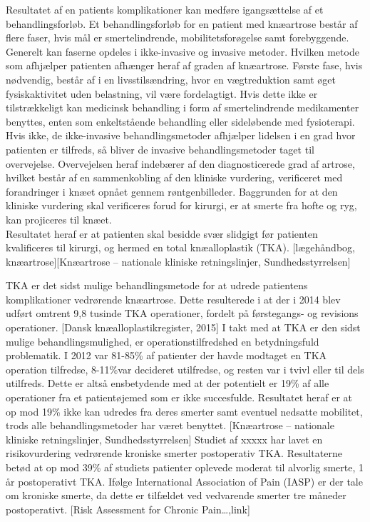 Resultatet af en patients komplikationer kan medføre igangsættelse af et behandlingsforløb. Et behandlingsforløb for en patient med knæartrose består af flere faser, hvis mål er smertelindrende, mobilitetsforøgelse samt forebyggende. Generelt kan faserne opdeles i ikke-invasive og invasive metoder. Hvilken metode som afhjælper patienten afhænger heraf af graden af knæartrose. Første fase, hvis nødvendig, består af i en livsstilsændring, hvor en vægtreduktion samt øget fysiskaktivitet uden belastning, vil være fordelagtigt. Hvis dette ikke er tilstrækkeligt kan medicinsk behandling i form af smertelindrende medikamenter benyttes, enten som enkeltstående behandling eller sideløbende med fysioterapi. Hvis ikke, de ikke-invasive behandlingsmetoder afhjælper lidelsen i en grad hvor patienten er tilfreds, så bliver de invasive behandlingsmetoder taget til overvejelse. Overvejelsen heraf indebærer af den diagnosticerede grad af artrose, hvilket består af en sammenkobling af den kliniske vurdering, verificeret med forandringer i knæet opnået gennem røntgenbilleder. Baggrunden for at den kliniske vurdering skal verificeres forud for kirurgi, er at smerte fra hofte og ryg, kan projiceres til knæet.\\
Resultatet heraf er at patienten skal besidde svær slidgigt før patienten kvalificeres til kirurgi, og hermed en total knæalloplastik (TKA).  [lægehåndbog, knæartrose][Knæartrose – nationale kliniske retningslinjer, Sundhedsstyrrelsen]

TKA er det sidst mulige behandlingsmetode for at udrede patientens komplikationer vedrørende knæartrose. Dette resulterede i at der i 2014 blev udført omtrent 9,8 tusinde TKA operationer, fordelt på førstegangs- og revisions operationer. [Dansk knæalloplastikregister, 2015] I takt med at TKA er den sidst mulige behandlingsmulighed, er operationstilfredshed en betydningsfuld problematik. I 2012 var 81-85\% af patienter der havde modtaget en TKA operation tilfredse, 8-11\%var decideret utilfredse, og resten var i tvivl eller til dels utilfreds. Dette er altså ensbetydende med at der potentielt er 19\% af alle operationer fra et patientøjemed som er ikke succesfulde. Resultatet heraf er at op mod 19\% ikke kan udredes fra deres smerter samt eventuel nedsatte mobilitet, trods alle behandlingsmetoder har været benyttet. [Knæartrose – nationale kliniske retningslinjer, Sundhedsstyrrelsen] Studiet af xxxxx har lavet en risikovurdering vedrørende kroniske smerter postoperativ TKA. Resultaterne betød at op mod 39\% af studiets patienter oplevede moderat til alvorlig smerte, 1 år postoperativt TKA. Ifølge International Association of Pain (IASP) er der tale om kroniske smerte, da dette er tilfældet ved vedvarende smerter tre måneder postoperativt. [Risk Assessment for Chronic Pain…,link] 

